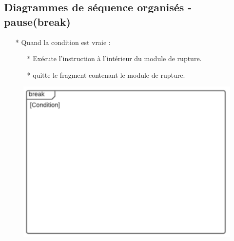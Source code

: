 \documentclass[12pt]{article}
\begin{document}
\subsection{Diagrammes de séquence organisés - pause(break)}
\begin{itemize}
	\item[*] Quand la condition est vraie :
	\begin{itemize}
		\item[*] Exécute l'instruction à l'intérieur du module de rupture.
		\item[* ] quitte le fragment contenant le module de rupture.
		
	\end{itemize}
\end{itemize}
\begin{figure}[!hbtp]
	\centering
	\includegraphics[scale=0.75]{Capture7.PNG}
\end{figure}
\end{document}
